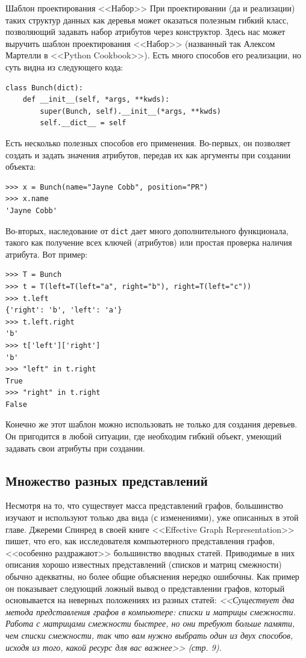 \begin{notice}{Шаблон проектирования <<Набор>>}
При проектировании (да и реализации) таких структур данных как деревья может оказаться полезным гибкий класс, позволяющий задавать набор атрибутов через конструктор. Здесь нас может выручить шаблон проектирования <<Набор>> (названный так Алексом Мартелли в <<Python Cookbook>>). Есть много способов его реализации, но суть видна из следующего кода:
\begin{lstlisting}
class Bunch(dict):
	def __init__(self, *args, **kwds):
		super(Bunch, self).__init__(*args, **kwds)
		self.__dict__ = self
\end{lstlisting}

Есть несколько полезных способов его применения. Во-первых, он позволяет создать и задать значения атрибутов, передав их как аргументы при создании объекта:
\begin{lstlisting}
>>> x = Bunch(name="Jayne Cobb", position="PR")
>>> x.name
'Jayne Cobb'
\end{lstlisting}

Во-вторых, наследование от \texttt{dict} дает много дополнительного функционала, такого как получение всех ключей (атрибутов) или простая проверка наличия атрибута. Вот пример:
\begin{lstlisting}
>>> T = Bunch
>>> t = T(left=T(left="a", right="b"), right=T(left="c"))
>>> t.left
{'right': 'b', 'left': 'a'}
>>> t.left.right
'b'
>>> t['left']['right']
'b'
>>> "left" in t.right
True
>>> "right" in t.right
False
\end{lstlisting}

Конечно же этот шаблон можно использовать не только для создания деревьев. Он пригодится в любой ситуации, где необходим гибкий объект, умеющий задавать свои атрибуты при создании.
\end{notice}

\subsection{Множество разных представлений}
\label{sec:multitude-representation}

Несмотря на то, что существует масса представлений графов, большинство изучают и используют только два вида (с изменениями), уже описанных в этой главе. Джереми Спинред в своей книге <<Effective Graph Representation>> пишет, что его, как исследователя компьютерного представления графов, <<особенно раздражают>> большинство вводных статей. Приводимые в них описания хорошо известных представлений (списков и матриц смежности) обычно адекватны, но более общие объяснения нередко ошибочны. Как пример он показывает следующий ложный вывод о представлении графов, который основывается на неверных положениях из разных статей:
\textit{<<Существует два метода представления графов в компьютере: списки и матрицы смежности. Работа с матрицами смежности быстрее, но они требуют больше памяти, чем списки смежности, так что вам нужно выбрать один из двух способов, исходя из того, какой ресурс для вас важнее>> (стр. 9).}

